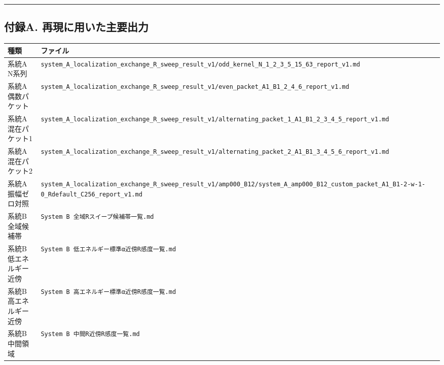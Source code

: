 \documentclass[
]{article}
\newcounter{none} %
\begin{document}
\begin{center}\rule{0.5\linewidth}{0.5pt}\end{center}

\subsection{付録A.
再現に用いた主要出力}\label{ux4ed8ux9332a.-ux518dux73feux306bux7528ux3044ux305fux4e3bux8981ux51faux529b}

{\def\LTcaptype{none} %
\begin{longtable}[]{@{}
  >{\raggedright\arraybackslash}p{}
  >{\raggedright\arraybackslash}p{}@{}}
\toprule\noalign{}
\begin{minipage}[b]{\linewidth}\raggedright
種類
\end{minipage} & \begin{minipage}[b]{\linewidth}\raggedright
ファイル
\end{minipage} \\
\midrule\noalign{}
\endhead
\bottomrule\noalign{}
\endlastfoot
系統A N系列 &
\texttt{system\_A\_localization\_exchange\_R\_sweep\_result\_v1/odd\_kernel\_N\_1\_2\_3\_5\_15\_63\_report\_v1.md} \\
系統A 偶数パケット &
\texttt{system\_A\_localization\_exchange\_R\_sweep\_result\_v1/even\_packet\_A1\_B1\_2\_4\_6\_report\_v1.md} \\
系統A 混在パケット1 &
\texttt{system\_A\_localization\_exchange\_R\_sweep\_result\_v1/alternating\_packet\_1\_A1\_B1\_2\_3\_4\_5\_report\_v1.md} \\
系統A 混在パケット2 &
\texttt{system\_A\_localization\_exchange\_R\_sweep\_result\_v1/alternating\_packet\_2\_A1\_B1\_3\_4\_5\_6\_report\_v1.md} \\
系統A 振幅ゼロ対照 &
\texttt{system\_A\_localization\_exchange\_R\_sweep\_result\_v1/amp000\_B12/system\_A\_amp000\_B12\_custom\_packet\_A1\_B1-2-w-1-0\_Rdefault\_C256\_report\_v1.md} \\
系統B 全域候補帯 & \texttt{System\ B\ 全域Rスイープ候補帯一覧.md} \\
系統B 低エネルギー近傍 &
\texttt{System\ B\ 低エネルギー標準α近傍R感度一覧.md} \\
系統B 高エネルギー近傍 &
\texttt{System\ B\ 高エネルギー標準α近傍R感度一覧.md} \\
系統B 中間領域 & \texttt{System\ B\ 中間R近傍R感度一覧.md} \\
\end{longtable}
}
\end{document}
